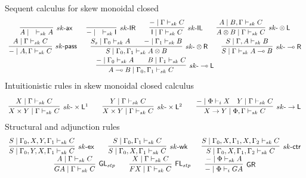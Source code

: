 \documentclass{article}
\newcommand{\tl}{\otimes \mathsf{L}}
\newcommand{\tr}{\otimes \mathsf{R}}
\newcommand{\lright}{\multimap \mathsf{R}}
\newcommand{\lleft}{\multimap \mathsf{L}}
\newcommand{\pass}{\mathsf{pass}}
\newcommand{\unitl}{\mathsf{IL}}
\newcommand{\unitr}{\mathsf{IR}}
\newcommand{\ax}{\mathsf{ax}}
\newcommand{\ot}{\otimes}
\newcommand{\lolli}{\multimap}
\newcommand{\I}{\mathsf{I}}
\newcommand{\fl}{\mathsf{FL}}
\newcommand{\gl}{\mathsf{GL}}
\newcommand{\gr}{\mathsf{GR}}
\newcommand{\td}{\text{-}}
\newcommand{\tms}{\times}
\newcommand{\tmslf}{\times \mathsf{L}^{1}}
\newcommand{\tmsls}{\times \mathsf{L}^{2}}
\newcommand{\rarl}{\rightarrow \mathsf{L}}
\newcommand{\wk}{\mathsf{wk}}
\newcommand{\ctr}{\mathsf{ctr}}
\newcommand{\ex}{\mathsf{ex}}
\begin{document}
  Sequent calculus for skew monoidal closed
  \vspace{-0.15cm}
   \begin{displaymath}
   \begin{array}{cc}
     \infer[sk\td\ax]{A \mid \quad \vdash_{sk} A}{}
     \qquad
     \infer[sk\td\unitr]{- \mid \quad \vdash_{sk} \I}{}
     \qquad
     \infer[sk\td\unitl]{\I \mid \Gamma \vdash_{sk} C}{- \mid \Gamma \vdash_{sk} C}
     \qquad
     \infer[sk\td\tl]{A \ot B \mid \Gamma \vdash_{sk} C}{A \mid B , \Gamma \vdash_{sk} C}
     \\
     \infer[sk\td\pass]{- \mid A, \Gamma \vdash_{sk} C}{A \mid \Gamma \vdash_{sk} C}
     \qquad
     \infer[sk\td\tr]{S \mid \Gamma_{0} , \Gamma_{1} \vdash_{sk} A \ot B}{
      \deduce{S_{s} \mid \Gamma_{0} \vdash_{sk} A}{}
      \qquad
      \deduce{- \mid \Gamma_{1} \vdash_{sk} B}{}
     }
     \qquad
     \infer[sk\td\lright]{S \mid \Gamma \vdash_{sk} A \lolli B}{S \mid \Gamma , A \vdash_{sk} B}
     \\
     \infer[sk\td\lleft]{A \lolli B \mid \Gamma_{0} , \Gamma_{1} \vdash_{sk} C}{
      \deduce{- \mid \Gamma_{0} \vdash_{sk} A}{}
      \qquad
      \deduce{B \mid \Gamma_{1} \vdash_{sk} C}{}
     }
   \end{array}
   \end{displaymath}
   Intuitionistic rules in skew monoidal closed calculus
   \begin{displaymath}
     \begin{array}{cc}
       \infer[sk\td\tmslf]{X \tms Y \mid \Gamma \vdash_{sk} C}{X \mid \Gamma \vdash_{sk} C}
       \qquad
       \infer[sk\td\tmsls]{X \tms Y \mid \Gamma \vdash_{sk} C}{Y \mid \Gamma \vdash_{sk} C}
       \qquad
       \infer[sk\td\rarl]{X \rightarrow Y \mid \Phi , \Gamma \vdash_{sk} C}{
         \deduce{- \mid \Phi \vdash_{i} X}{}
         &
         \deduce{Y \mid \Gamma \vdash_{sk} C}{}
       }
     \end{array}
   \end{displaymath}
   Structural and adjunction rules
   \begin{displaymath}
     \begin{array}{cc}
        \infer[sk\td\ex]{S \mid \Gamma_{0} , Y , X , \Gamma_{1} \vdash_{sk} C}{S \mid \Gamma_{0} , X , Y , \Gamma_{1} \vdash_{sk} C}
        \qquad
        \infer[sk\td\wk]{S \mid  \Gamma_{0} , X , \Gamma_{1} \vdash_{sk} C}{S \mid \Gamma_{0} , \Gamma_{1} \vdash_{sk} C}
        \qquad
        \infer[sk\td\ctr]{S \mid \Gamma_{0} , X, \Gamma_{1}, \Gamma_{2} \vdash_{sk} C}{S \mid \Gamma_{0} , X , \Gamma_{1} ,X, \Gamma_{2} \vdash_{sk} C}
        \\
       \infer[\gl_{stp}]{GA \mid \Gamma \vdash_{sk} C}{A \mid \Gamma \vdash_{sk} C}
       \qquad
       \infer[\fl_{stp}]{FX \mid \Gamma \vdash_{sk} C}{X \mid \Gamma \vdash_{sk} C}
       \qquad
       \infer[\gr]{- \mid \Phi \vdash_{i} GA}{- \mid \Phi \vdash_{sk} A}
     \end{array}
   \end{displaymath}
\end{document}
